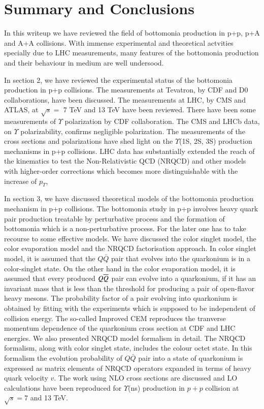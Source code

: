 \section{Summary and Conclusions}
\label{sec:conclusions}
In this writeup we have reviewed the field of bottomonia production in
p+p, p+A and A+A collisions. With immense experimental and theoretical actvities
specially due to LHC measurements, many features of the bottomonia production
and their behaviour in medium are well undersood.

In section 2, we have reviewed the experimental status of the bottomonia production
in p+p collisions. The measurements at Tevatron, by CDF and D0 collaborations,
have been discussed. The measurements at LHC, by CMS and ATLAS, at ${\sqrt s}=$ 7 TeV and
13 TeV have been reviewed. There have been some measurements 
of $\Upsilon$ polarization by CDF collaboration.
The CMS and LHCb data, on $\Upsilon$ polarizability, confirms 
negligible polarization. 
The measurements of the cross sections and polarizations have shed light on the
$\Upsilon$(1S, 2S, 3S) production mechanisms in p+p collisions.
LHC data has substantially extended the reach of the kinematics to test the
Non-Relativistic QCD (NRQCD) and other models with 
higher-order corrections which becomes more
distinguishable with the increase of $p_{T}$,


In section 3, we have discussed theoretical models of the bottomonia production
mechanism in p+p collisions. The bottomonia study in p+p involves heavy quark
pair production treatable by perturbative process and the formation of bottomonia 
which is a non-perturbative process.
For the later one has to take recourse to some effective models. We have discussed the 
color singlet model, the color evaporation model and the NRQCD factorisation approach.
In color singlet model, it is assumed that the $Q\bar Q$ pair that evolves into
the quarkonium is in a color-singlet state. 
On the other hand in the color evaporation model,
it is assumed that every produced $Q \overline{Q}$ pair can evolve into a quarkonium,
if it has an invariant mass that is less than the threshold for
producing a pair of open-flavor heavy mesons.
The probability factor of a pair evolving into quarkonium is obtained by fitting with
the experiments which is supposed to be independent of collision energy. 
The so-called Improved CEM reproduces the tranverse momentum dependence of the
quarkonium cross section at CDF and LHC energies.  
We also presented NRQCD model formalism in detail.
The NRQCD formalism, along with color singlet state, includes the colour octet state.
In this formalism the evolution probability of $Q\bar{Q}$
pair into a state of quarkonium is expressed as matrix elements of NRQCD operators
expanded in terms of heavy quark velocity $v$.
The work using NLO cross sections are discussed and LO calculations have been
reproduced for $\Upsilon$(ns)
production in $p+p$ collision at $\sqrt s = 7$ and 13 TeV.

